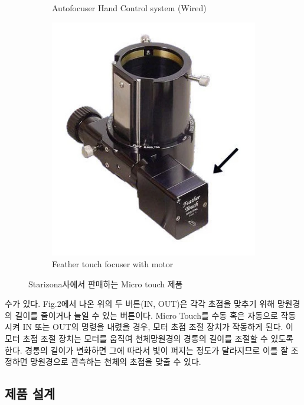 \begin{figure}[h]
\begin{center}
\begin{subfigure}{0.45\textwidth}
			\caption{Autofocuser Hand Control system (Wired)}
			\label{fig:microtouch_3}
		\end{subfigure}
		\begin{subfigure}{0.45\textwidth}
			\includegraphics[width=0.9\linewidth]{microtouch_4}
			\caption{Feather touch focuser with motor}
			\label{fig:microtouch_4}
		\end{subfigure}
		\caption{Starizona사에서 판매하는 Micro touch 제품}
		\label{fig:microtouch}
	\end{center}
\end{figure}



수가 있다. Fig.2에서 나온 위의 두 버튼(IN, OUT)은 각각 초점을 맞추기 위해 망원경의 길이를 줄이거나 늘일 수 있는 버튼이다. Micro Touch를 수동 혹은 자동으로 작동시켜 IN 또는 OUT의 명령을 내렸을 경우, 모터 초점 조절 장치가 작동하게 된다. 이 모터 초점 조절 장치는 모터를 움직여 천체망원경의 경통의 길이를 조절할 수 있도록 한다. 경통의 길이가 변화하면 그에 따라서 빛이 퍼지는 정도가 달라지므로 이를 잘 조정하면 망원경으로 관측하는 천체의 초점을 맞출 수 있다.

\subsection{제품 설계}

